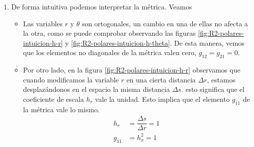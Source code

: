 \begin{enumerate}
\item De forma intuitiva podemos interpretar la métrica. Veamos
  \begin{itemize}
  \item Las variables $r$ y $\theta$ son ortogonales, un cambio en una de ellas no afecta
    a la otra, como se puede comprobar observando las figuras
    \ref{fig:R2-polares-intuicion-h-r} y \ref{fig:R2-polares-intuicion-h-theta}.
    De esta manera, vemos que los elementos no diagonales de la métrica valen cero,
    $g_{12}=g_{21}=0$.
  \item Por otro lado, en la figura \ref{fig:R2-polares-intuicion-h-r} observamos que
    cuando modificamos la variable $r$ en una cierta distancia $\Delta r$, estamos
    desplazándonos en el espacio la misma distancia $\Delta s$. esto significa que
    el coeficiente de escala $h_r$ vale la unidad. Esto implica que el elemento
    $g_{11}$ de la métrica vale lo mismo.
    \begin{subequations}
      \begin{align}
        h_r
        &=
          \dfrac{\Delta s}{\Delta r} = 1\\[2pt]
        g_{11}
        &=
          h_x^2 = 1
      \end{align}
    \end{subequations}


\end{itemize}
\end{enumerate}
